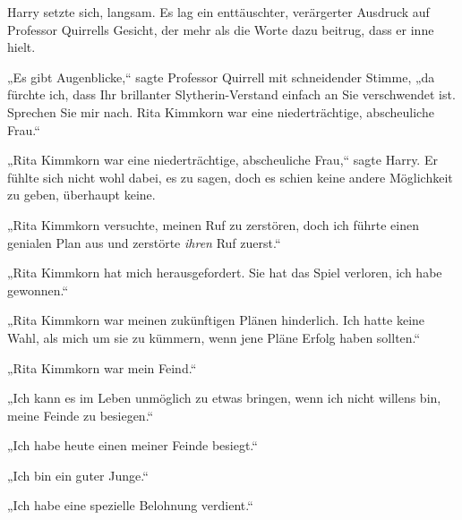 Harry setzte sich, langsam. Es lag ein enttäuschter, verärgerter Ausdruck auf Professor Quirrells Gesicht, der mehr als die Worte dazu beitrug, dass er inne hielt.

„Es gibt Augenblicke,“ sagte Professor Quirrell mit schneidender Stimme, „da fürchte ich, dass Ihr brillanter Slytherin-Verstand einfach an Sie verschwendet ist. Sprechen Sie mir nach. Rita Kimmkorn war eine niederträchtige, abscheuliche Frau.“

„Rita Kimmkorn war eine niederträchtige, abscheuliche Frau,“ sagte Harry. Er fühlte sich nicht wohl dabei, es zu sagen, doch es schien keine andere Möglichkeit zu geben, überhaupt keine.

„Rita Kimmkorn versuchte, meinen Ruf zu zerstören, doch ich führte einen genialen Plan aus und zerstörte \emph{ihren} Ruf zuerst.“

„Rita Kimmkorn hat mich herausgefordert. Sie hat das Spiel verloren, ich habe gewonnen.“

„Rita Kimmkorn war meinen zukünftigen Plänen hinderlich. Ich hatte keine Wahl, als mich um sie zu kümmern, wenn jene Pläne Erfolg haben sollten.“

„Rita Kimmkorn war mein Feind.“

„Ich kann es im Leben unmöglich zu etwas bringen, wenn ich nicht willens bin, meine Feinde zu besiegen.“

„Ich habe heute einen meiner Feinde besiegt.“

„Ich bin ein guter Junge.“

„Ich habe eine spezielle Belohnung verdient.“

